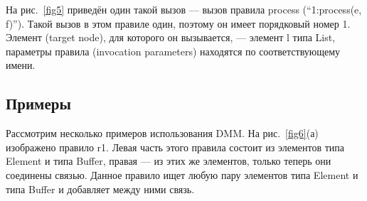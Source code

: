 \documentclass[a5paper]{article}
\begin{document}
На рис.~\ref{fig5} приведён один такой вызов — вызов правила process (“1:process(e, f)”). Такой вызов в этом правиле один, поэтому он имеет порядковый номер 1. Элемент (target node), для которого он вызывается, — элемент l типа List, параметры правила (invocation parameters) находятся по соответствующему имени.

\subsection{Примеры}

Рассмотрим несколько примеров использования DMM. На рис.~\ref{fig6}(а) изображено правило r1. Левая часть этого правила состоит из элементов типа Element и типа Buffer, правая — из этих же элементов, только теперь они соединены связью. Данное правило ищет любую пару элементов типа Element и типа Buffer и добавляет между ними связь.
\end{document}
